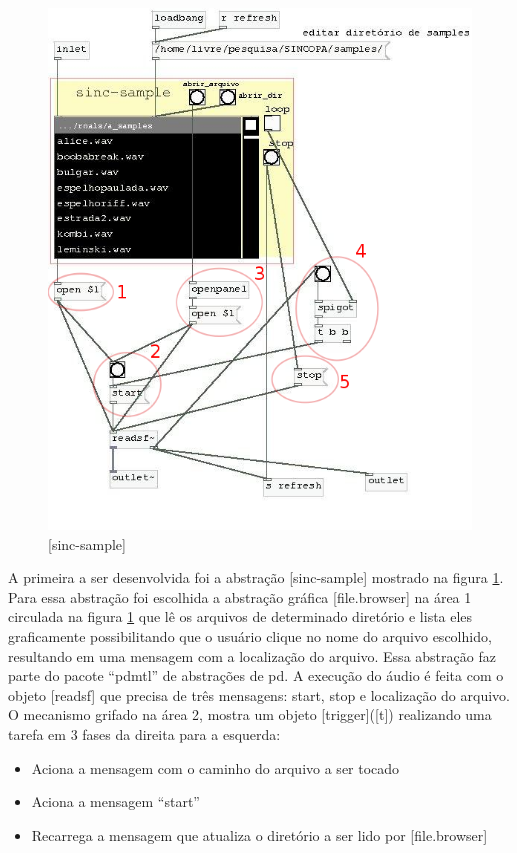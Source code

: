 \documentclass[draft]{ppgmus}
\begin{document}
\begin{figure}
\includegraphics[scale=.5]{sinc-sample}
\caption{[sinc-sample]}
\label{[sinc-sample]}
\end{figure}



A primeira a ser desenvolvida foi a abstração [sinc-sample] mostrado na figura
\ref{[sinc-sample]}. Para essa abstração foi escolhida a abstração gráfica 
[file.browser] 
na área 1 circulada na figura \ref{[sinc-sample]} que lê os arquivos de determinado
 diretório e lista eles graficamente possibilitando que
o usuário clique no nome do arquivo escolhido, resultando em uma mensagem com a 
localização
do arquivo. Essa abstração faz parte do pacote ``pdmtl'' de abstrações de pd.
A execução do áudio é feita com o objeto [readsf\texttildelow] que precisa de três mensagens:
start, stop e localização do arquivo. O mecanismo grifado na área 2, mostra
um objeto [trigger]([t]) realizando uma tarefa em 3 fases da direita para a esquerda:
\begin{itemize}
 \item Aciona a mensagem com o caminho do arquivo a ser tocado
 \item Aciona a mensagem ``start''
 \item Recarrega a mensagem que atualiza o diretório a ser lido por [file.browser]
\end{itemize}
\end{document}
